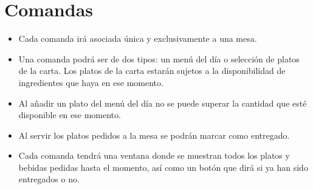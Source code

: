 \section{Comandas}

\begin{itemize}
\item Cada comanda irá asociada única y exclusivamente a una mesa.
\item Una comanda podrá ser de dos tipos: un menú del día o selección de platos de la carta. Los platos de la carta estarán sujetos a la disponibilidad de ingredientes que haya en ese momento.
\item Al añadir un plato del menú del día no se puede superar la cantidad que esté disponible en ese momento.
\item Al servir los platos pedidos a la mesa se podrán marcar como entregado.
\item Cada comanda tendrá una ventana donde se muestran todos los platos y bebidas pedidas hasta el momento, así como un botón que dirá si ya han sido entregados o no.
\end{itemize}